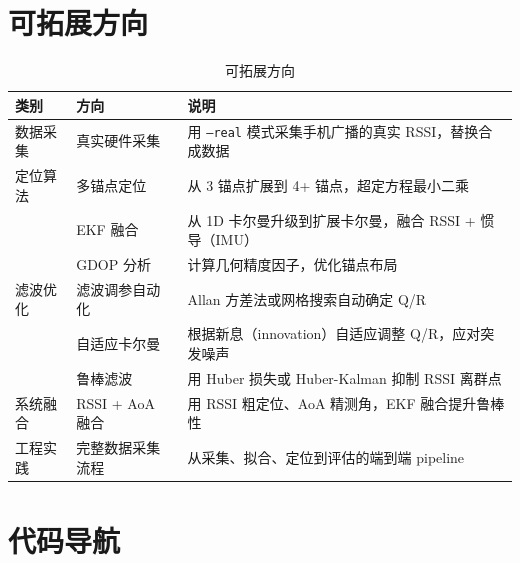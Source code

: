 \documentclass[11pt,a4paper]{article}
\newcommand{\code}[1]{\texttt{#1}}
\begin{document}
\section{可拓展方向}

\begin{table}[H]
\centering
\caption{可拓展方向}
\small
\begin{tabular}{llp{8.5cm}}
\toprule
\textbf{类别} & \textbf{方向} & \textbf{说明} \\
\midrule
数据采集 & 真实硬件采集 & 用 \code{--real} 模式采集手机广播的真实 RSSI，替换合成数据 \\
\hline
定位算法 & 多锚点定位 & 从 3 锚点扩展到 4+ 锚点，超定方程最小二乘 \\
& EKF 融合 & 从 1D 卡尔曼升级到扩展卡尔曼，融合 RSSI + 惯导（IMU） \\
& GDOP 分析 & 计算几何精度因子，优化锚点布局 \\
\hline
滤波优化 & 滤波调参自动化 & Allan 方差法或网格搜索自动确定 Q/R \\
& 自适应卡尔曼 & 根据新息（innovation）自适应调整 Q/R，应对突发噪声 \\
& 鲁棒滤波 & 用 Huber 损失或 Huber-Kalman 抑制 RSSI 离群点 \\
\hline
系统融合 & RSSI + AoA 融合 & 用 RSSI 粗定位、AoA 精测角，EKF 融合提升鲁棒性 \\
\hline
工程实践 & 完整数据采集流程 & 从采集、拟合、定位到评估的端到端 pipeline \\
\bottomrule
\end{tabular}
\end{table}

\section{代码导航}
\end{document}
